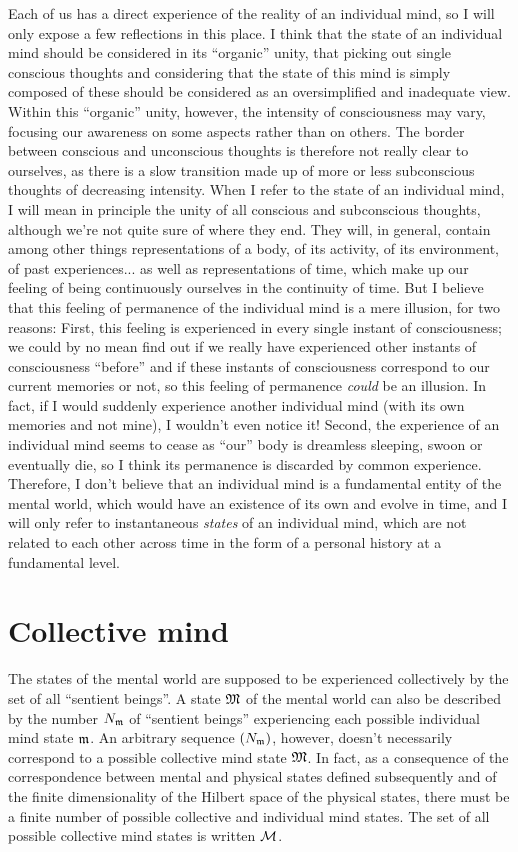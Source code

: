 \documentclass[10pt,a4paper,twoside,openany]{book}
\begin{document}
Each of us has a direct experience of the reality of an individual mind, so I will only expose a few reflections in this place. I think that the state of an individual mind should be considered in its ``organic'' unity, that picking out single conscious thoughts and considering that the state of this mind is simply composed of these should be considered as an oversimplified and inadequate view. Within this ``organic'' unity, however, the intensity of consciousness may vary, focusing our awareness on some aspects rather than on others. The border between conscious and unconscious thoughts is therefore not really clear to ourselves, as there is a slow transition made up of more or less subconscious thoughts of decreasing intensity. When I refer to the state of an individual mind, I will mean in principle the unity of all conscious and subconscious thoughts, although we're not quite sure of where they end. They will, in general, contain among other things representations of a body, of its activity, of its environment, of past experiences... as well as representations of time, which make up our feeling of being continuously ourselves in the continuity of time. But I believe that this feeling of permanence of the individual mind is a mere illusion, for two reasons: First, this feeling is experienced in every single instant of consciousness; we could by no mean find out if we really have experienced other instants of consciousness ``before'' and if these instants of consciousness correspond to our current memories or not, so this feeling of permanence \textit{could} be an illusion. In fact, if I would suddenly experience another individual mind (with its own memories and not mine), I wouldn't even notice it! Second, the experience of an individual mind seems to cease as ``our'' body is dreamless sleeping, swoon or eventually die, so I think its permanence is discarded by common experience. Therefore, I don't believe that an individual mind is a fundamental entity of the mental world, which would have an existence of its own and evolve in time, and I will only refer to instantaneous \textit{states} of an individual mind, which are not related to each other across time in the form of a personal history at a fundamental level.

\section{Collective mind}

The states of the mental world are supposed to be experienced collectively by the set of all ``sentient beings''. A state $\mathfrak{M}$ of the mental world can also be described by the number ${N}_{\mathfrak{m}}$ of ``sentient beings'' experiencing each possible individual mind state $\mathfrak{m}$. An arbitrary sequence $({N}_{\mathfrak{m}})$, however, doesn't necessarily correspond to a possible collective mind state $\mathfrak{M}$. In fact, as a consequence of the correspondence between mental and physical states defined subsequently and of the finite dimensionality of the Hilbert space of the physical states, there must be a finite number of possible collective and individual mind states. The set of all possible collective mind states is written $\mathcal M$.
\end{document}
